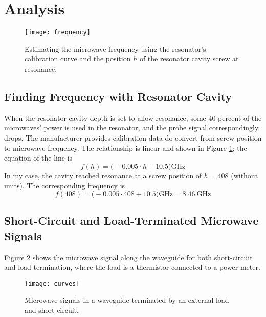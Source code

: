 \documentclass[11pt, a4paper]{article}
\begin{document}
\section{Analysis}

\begin{figure}[htb!]
	\texttt{[image: frequency]}
	\caption{Estimating the microwave frequency using the resonator's calibration curve and the position $ h $ of the resonator cavity screw at resonance.}
	\label{mikval:fig:frequency}
\end{figure}


\subsection{Finding Frequency with Resonator Cavity}
When the resonator cavity depth is set to allow resonance, some 40 percent of the microwaves' power is used in the resonator, and the probe signal correspondingly drops. The manufacturer provides calibration data do convert from screw position to microwave frequency. The relationship is linear and shown in Figure \ref{mikval:fig:frequency}; the equation of the line is
\begin{equation*}
	f(h) = \big(- 0.005 \cdot h + 10.5 \big) \si{\giga \hertz}
\end{equation*}
In my case, the cavity reached resonance at a screw position of $ h = 408 $ (without units). The corresponding frequency is
\begin{equation*}
	f(408) = \big(- 0.005 \cdot 408 + 10.5 \big) \si{\giga \hertz} = \SI{8.46}{\giga \hertz}
\end{equation*}



\subsection{Short-Circuit and Load-Terminated Microwave Signals}
Figure \ref{mikval:fig:curves} shows the microwave signal along the waveguide for both short-circuit and load termination, where the load is a thermistor connected to a power meter.

\begin{figure}
	\texttt{[image: curves]}
	\caption{Microwave signals in a waveguide terminated by an external load and short-circuit.}
	\label{mikval:fig:curves}
\end{figure}
\end{document}
